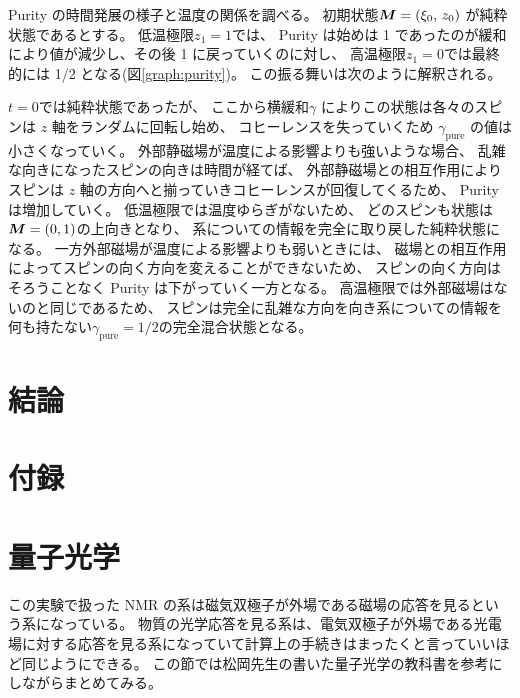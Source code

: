 \documentclass[11pt,dvipdfmx,a4paper]{jsarticle}
\begin{document}
Purity の時間発展の様子と温度の関係を調べる。
初期状態\(\vb*{M}=(\xi_0,\,z_0)\) が純粋状態であるとする。
低温極限\(z_{1}=1\)では、
Purity は始めは 1 であったのが緩和により値が減少し、その後 1 に戻っていくのに対し、
高温極限\(z_{1}=0\)では最終的には 1/2 となる(図\ref{graph:purity})。
この振る舞いは次のように解釈される。

\(t=0\)では純粋状態であったが、
ここから横緩和\(\gamma\) によりこの状態は各々のスピンは \(z\) 軸をランダムに回転し始め、
コヒーレンスを失っていくため \(\gamma_{\text{pure}}\) の値は小さくなっていく。
外部静磁場が温度による影響よりも強いような場合、
乱雑な向きになったスピンの向きは時間が経てば、
外部静磁場との相互作用によりスピンは \(z\) 軸の方向へと揃っていきコヒーレンスが回復してくるため、
Purity は増加していく。
低温極限では温度ゆらぎがないため、
どのスピンも状態は\(\vb*{M}=(0,1)\)の上向きとなり、
系についての情報を完全に取り戻した純粋状態になる。
一方外部磁場が温度による影響よりも弱いときには、
磁場との相互作用によってスピンの向く方向を変えることができないため、
スピンの向く方向はそろうことなく Purity は下がっていく一方となる。
高温極限では外部磁場はないのと同じであるため、
スピンは完全に乱雑な方向を向き系についての情報を何も持たない\(\gamma_{\text{pure}}=1/2\)の完全混合状態となる。



\section{結論}





\section*{付録}


\section{量子光学}
この実験で扱った NMR の系は磁気双極子が外場である磁場の応答を見るという系になっている。
物質の光学応答を見る系は、電気双極子が外場である光電場に対する応答を見る系になっていて計算上の手続きはまったくと言っていいほど同じようにできる。
この節では松岡先生の書いた量子光学の教科書\cite{Matsuoka_2000}を参考にしながらまとめてみる。
\end{document}
